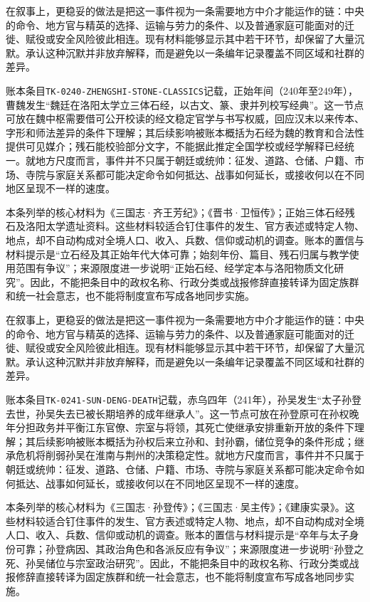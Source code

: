 在叙事上，更稳妥的做法是把这一事件视为一条需要地方中介才能运作的链：中央的命令、地方官与精英的选择、运输与劳力的条件、以及普通家庭可能面对的迁徙、赋役或安全风险彼此相连。现有材料能够显示其中若干环节，却保留了大量沉默。承认这种沉默并非放弃解释，而是避免以一条编年记录覆盖不同区域和社群的差异。

账本条目\texttt{TK-0240-ZHENGSHI-STONE-CLASSICS}记载，正始年间（240年至249年），曹魏发生“魏廷在洛阳太学立三体石经，以古文、篆、隶并列校写经典”。这一节点可放在魏中枢需要借可公开校读的经文稳定官学与书写权威，回应汉末以来传本、字形和师法差异的条件下理解；其后续影响被账本概括为石经为魏的教育和合法性提供可见媒介；残石能校验部分文字，不能据此推定全国学校或经学解释已经统一。就地方尺度而言，事件并不只属于朝廷或统帅：征发、道路、仓储、户籍、市场、寺院与家庭关系都可能决定命令如何抵达、战事如何延长，或接收何以在不同地区呈现不一样的速度。

本条列举的核心材料为《三国志·齐王芳纪》；《晋书·卫恒传》；正始三体石经残石及洛阳太学遗址资料。这些材料较适合钉住事件的发生、官方表述或特定人物、地点，却不自动构成对全境人口、收入、兵数、信仰或动机的调查。账本的置信与材料提示是“立石经及其正始年代大体可靠；始刻年份、篇目、残石归属与教学使用范围有争议”；来源限度进一步说明“正始石经、经学定本与洛阳物质文化研究”。因此，不能把条目中的政权名称、行政分类或战报修辞直接转译为固定族群和统一社会意志，也不能将制度宣布写成各地同步实施。

在叙事上，更稳妥的做法是把这一事件视为一条需要地方中介才能运作的链：中央的命令、地方官与精英的选择、运输与劳力的条件、以及普通家庭可能面对的迁徙、赋役或安全风险彼此相连。现有材料能够显示其中若干环节，却保留了大量沉默。承认这种沉默并非放弃解释，而是避免以一条编年记录覆盖不同区域和社群的差异。

账本条目\texttt{TK-0241-SUN-DENG-DEATH}记载，赤乌四年（241年），孙吴发生“太子孙登去世，孙吴失去已被长期培养的成年继承人”。这一节点可放在孙登原可在孙权晚年分担政务并平衡江东官僚、宗室与将领，其死亡使继承安排重新开放的条件下理解；其后续影响被账本概括为孙权后来立孙和、封孙霸，储位竞争的条件形成；继承危机将削弱孙吴在淮南与荆州的决策稳定性。就地方尺度而言，事件并不只属于朝廷或统帅：征发、道路、仓储、户籍、市场、寺院与家庭关系都可能决定命令如何抵达、战事如何延长，或接收何以在不同地区呈现不一样的速度。

本条列举的核心材料为《三国志·孙登传》；《三国志·吴主传》；《建康实录》。这些材料较适合钉住事件的发生、官方表述或特定人物、地点，却不自动构成对全境人口、收入、兵数、信仰或动机的调查。账本的置信与材料提示是“卒年与太子身份可靠；孙登病因、其政治角色和各派反应有争议”；来源限度进一步说明“孙登之死、孙吴储位与宗室政治研究”。因此，不能把条目中的政权名称、行政分类或战报修辞直接转译为固定族群和统一社会意志，也不能将制度宣布写成各地同步实施。

